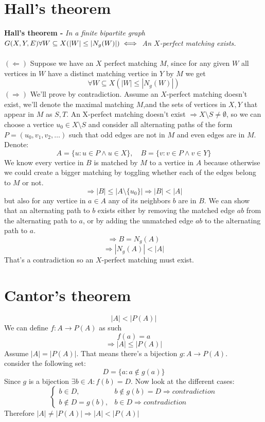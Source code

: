 \documentclass{article}
\begin{document}
	\section{Hall's theorem}
		\textbf{Hall's theorem - } \emph{In a finite bipartite graph 			$G(X,Y,E) \\ \forall W\subseteq X(|W|\le|N_g(W)|)\iff $ An $X$-perfect matching exists.}\\\\
		$(\Leftarrow)$ Suppose we have an $X$ perfect matching $M$, since for any given $W$ all vertices in $W$ have a distinct matching vertice in $Y$ by $M$ we get
		\[\forall W\subseteq X(|W|\le|N_g(W)|)\]
		$(\Rightarrow)$ We'll prove by contradiction. Assume an $X$-perfect matching doesn't exist, we'll denote the maximal matching $M$,and the sets of vertices in $X,Y$ that appear in $M$ as $S,T$.
		An X-perfect matching doesn't exist $\Rightarrow X\setminus S\neq\emptyset$, so we can choose a vertice $u_0\in X\setminus S$ and consider all alternating paths of the form $P=(u_0,v_1,v_2,\ldots)$ such that odd edges are not in $M$ and even edges are in $M$.
		Denote: \[A=\{u:u\in P \land u\in X\} ,\quad B=\{v:v\in P \land v\in Y\}\]
		We know every vertice in $B$ is matched by $M$ to a vertice in $A$ because otherwise we could create a bigger matching by toggling whether each of the edges belong to $M$ or not.
		\[\Rightarrow |B|\le|A\setminus \{u_0\}| \Rightarrow |B|<|A|\]
		but also for any vertice in $a\in A$ any of its neighbors $b$ are in $B$. We can show that an alternating path to $b$ exists either by removing the matched edge $ab$ from the alternating path to $a$, or by adding the unmatched edge $ab$ to the alternating path to $a$.
		\[\Rightarrow B=N_g(A) \] \[\Rightarrow |N_g(A)|<|A|\] 
		That's a contradiction so an $X$-perfect matching must exist.
		
\newpage
	\section{Cantor's theorem}
		\[|A|<|P(A)|\]
		We can define $f:A\rightarrow P(A)$ as such
		\[f(a) = {a}\]
		\[\Rightarrow |A|\le|P(A)|\]
		Assume $|A|=|P(A)|$. That means there's a bijection $g:A\rightarrow P(A)$. \\
		consider the following set:
		\[D = \{a:a\notin g(a)\}\]
		Since $g$ is a bijection $\exists b\in A:f(b)=D$. Now look at the different cases:
		\[
		\begin{cases}
		b\in D, & b\notin g(b)=D \Rightarrow contradiction\\
		b\notin D=g(b), & b\in D \Rightarrow contradiction
		\end{cases}
		\]
		Therefore $|A|\neq|P(A)| \Rightarrow |A|<|P(A)|$
		
\end{document}
